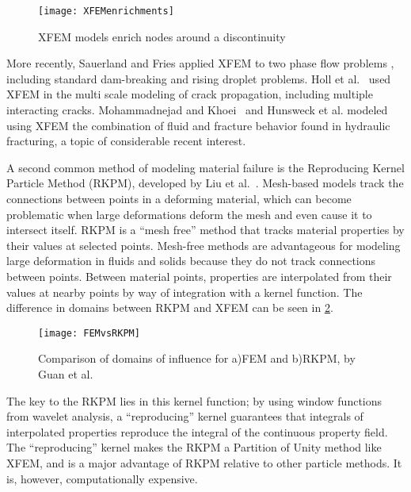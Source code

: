 %
\begin{figure}[h]
  \centering
\texttt{[image: XFEMenrichments]}
\caption[XFEM models enrich nodes around a discontinuity]{XFEM models enrich nodes around a discontinuity\cite{fries2010extended}}
\label{fig:XFEM}
\end{figure}
%

More recently, Sauerland and Fries applied XFEM to two phase flow problems \cite{sauerland2013stable}, including standard dam-breaking and rising droplet problems.
Holl et al.~\cite{holl2013adaptive} used XFEM in the multi scale modeling of crack propagation, including multiple interacting cracks.
Mohammadnejad and Khoei~\cite{mohammadnejad2013hydro} and Hunsweck et al. \cite{hunsweck2013finite} modeled using XFEM the combination of fluid and fracture behavior found in hydraulic fracturing, a topic of considerable recent interest.

A second common method of modeling material failure is the Reproducing Kernel Particle Method (RKPM), developed by Liu et al.~\cite{liu1995reproducing}.
Mesh-based models track the connections between points in a deforming material, which can become problematic when large deformations deform the mesh and even cause it to intersect itself.
RKPM is a ``mesh free'' method that tracks material properties by their values at selected points.
Mesh-free methods are advantageous for modeling large deformation in fluids and solids because they do not track connections between points.
Between material points, properties are interpolated from their values at nearby points by way of integration with a kernel function.
The difference in domains between RKPM and XFEM can be seen in \cref{fig:FEMvsRKPM}.
%
\begin{figure}[h]
  \centering
\texttt{[image: FEMvsRKPM]}
\caption[Comparison of domains of influence for FEM and RKPM]{Comparison of domains of influence for a)FEM and b)RKPM, by Guan et al. \cite{guan2011semi}}
\label{fig:FEMvsRKPM}
\end{figure}
%
The key to the RKPM lies in this kernel function; by using window functions from wavelet analysis, a ``reproducing'' kernel guarantees that  integrals of interpolated properties reproduce the integral of the continuous property field.
The ``reproducing'' kernel makes the RKPM a Partition of Unity method like XFEM, and is a major advantage of RKPM relative to other particle methods.
It is, however, computationally expensive. 

